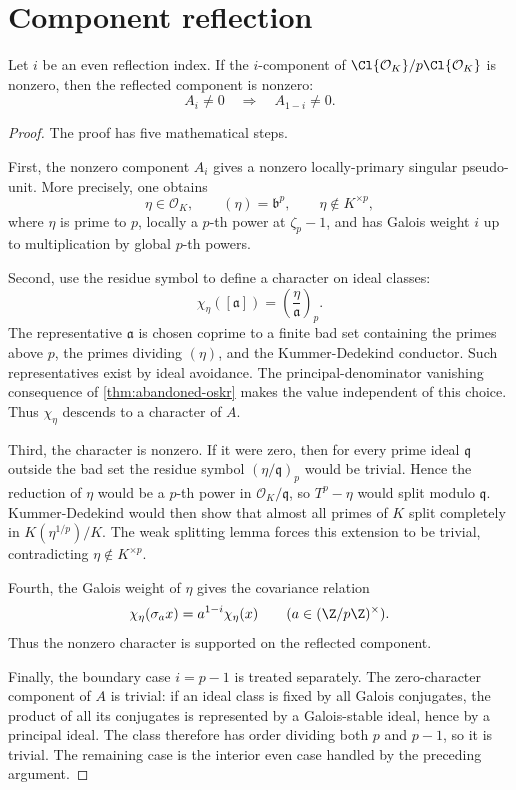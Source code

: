 \section{Component reflection}

\begin{theorem}
  \label{thm:abandoned-component-reflection}
  \leanok
Let \(i\) be an even reflection index.  If the \(i\)-component of
\(\Cl{\mathcal O_K}/p\Cl{\mathcal O_K}\) is nonzero, then the reflected
component is nonzero:
\[
  A_i\ne0\quad\Longrightarrow\quad A_{1-i}\ne0.
\]
\end{theorem}

\begin{proof}\leanok
The proof has five mathematical steps.

First, the nonzero component \(A_i\) gives a nonzero locally-primary singular
pseudo-unit.  More precisely, one obtains
\[
  \eta\in\mathcal O_K,\qquad
  (\eta)=\mathfrak b^p,\qquad
  \eta\notin K^{\times p},
\]
where \(\eta\) is prime to \(p\), locally a \(p\)-th power at
\(\zeta_p-1\), and has Galois weight \(i\) up to multiplication by global
\(p\)-th powers.

Second, use the residue symbol to define a character on ideal classes:
\[
  \chi_\eta([\mathfrak a])
  =
  \left(\frac{\eta}{\mathfrak a}\right)_p.
\]
The representative \(\mathfrak a\) is chosen coprime to a finite bad set
containing the primes above \(p\), the primes dividing \((\eta)\), and the
Kummer-Dedekind conductor.  Such representatives exist by ideal avoidance.
The principal-denominator vanishing consequence of
\cref{thm:abandoned-oskr} makes the value independent of this choice.  Thus
\(\chi_\eta\) descends to a character of \(A\).

Third, the character is nonzero.  If it were zero, then for every prime ideal
\(\mathfrak q\) outside the bad set the residue symbol
\((\eta/\mathfrak q)_p\) would be trivial.  Hence the reduction of \(\eta\)
would be a \(p\)-th power in \(\mathcal O_K/\mathfrak q\), so
\(T^p-\eta\) would split modulo \(\mathfrak q\).  Kummer-Dedekind would then
show that almost all primes of \(K\) split completely in
\(K(\eta^{1/p})/K\).  The weak splitting lemma forces this extension to be
trivial, contradicting \(\eta\notin K^{\times p}\).

Fourth, the Galois weight of \(\eta\) gives the covariance relation
\[
  \chi_\eta(\sigma_a x)=a^{1-i}\chi_\eta(x)
  \qquad (a\in(\Z/p\Z)^\times).
\]
Thus the nonzero character is supported on the reflected component.

Finally, the boundary case \(i=p-1\) is treated separately.  The zero-character
component of \(A\) is trivial: if an ideal class is fixed by all Galois
conjugates, the product of all its conjugates is represented by a
Galois-stable ideal, hence by a principal ideal.  The class therefore has
order dividing both \(p\) and \(p-1\), so it is trivial.  The remaining case
is the interior even case handled by the preceding argument.
\end{proof}

